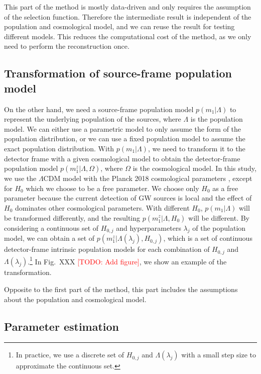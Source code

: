 \documentclass[aps,prd,twocolumn,superscriptaddress,preprintnumbers,nofootinbib,hidelinks]{revtex4-2}
\newcommand{\todo}[1]{\textcolor{red}{[TODO: #1]}}
\begin{document}
This part of the method is mostly data-driven and only requires the assumption of the selection function.
Therefore the intermediate result is independent of the population and cosmological model, and we can reuse the result for testing different models.
This reduces the computational cost of the method, as we only need to perform the reconstruction once.

\subsection{Transformation of source-frame population model}
\label{sec:transformation}

On the other hand, we need a source-frame population model $p(m_1|\Lambda)$ to represent the underlying population of the sources, where $\Lambda$ is the population model.
We can either use a parametric model to only assume the form of the population distribution, or we can use a fixed population model to assume the exact population distribution.
With $p(m_1|\Lambda)$, we need to transform it to the detector frame with a given cosmological model to obtain the detector-frame population model $p(m^z_1|\Lambda, \Omega)$, where $\Omega$ is the cosmological model.
In this study, we use the $\Lambda$CDM model with the Planck 2018 cosmological parameters \citep{Planck:2018vyg}, except for $H_0$ which we choose to be a free parameter.
We choose only $H_0$ as a free parameter because the current detection of \ac{GW} sources is local and the effect of $H_0$ dominates other cosmological parameters.
With different $H_0$, $p(m_1|\Lambda)$ will be transformed differently, and the resulting $p(m^z_1|\Lambda, H_0)$ will be different.
By considering a continuous set of $H_{0,j}$ and hyperparameters $\lambda_j$ of the population model, we can obtain a set of $p(m^z_1|\Lambda(\lambda_j), H_{0,j})$, which is a set of continuous detector-frame intrinsic population models for each combination of $H_{0,j}$ and $\Lambda(\lambda_j)$.\footnote{In practice, we use a discrete set of $H_{0,j}$ and $\Lambda(\lambda_j)$ with a small step size to approximate the continuous set.}
In Fig.~XXX \todo{Add figure}, we show an example of the transformation.

Opposite to the first part of the method, this part includes the assumptions about the population and cosmological model.

\subsection{Parameter estimation}
\label{sec:pe}
\end{document}
